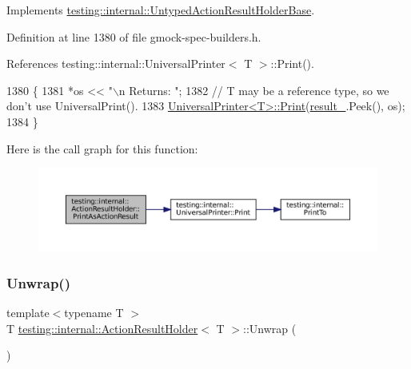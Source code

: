 Implements \hyperlink{classtesting_1_1internal_1_1UntypedActionResultHolderBase_a4b4a558fcb1d3b02c0fec34f186d3b90}{testing\+::internal\+::\+Untyped\+Action\+Result\+Holder\+Base}.



Definition at line 1380 of file gmock-\/spec-\/builders.\+h.



References testing\+::internal\+::\+Universal\+Printer$<$ T $>$\+::\+Print().


\begin{DoxyCode}
1380                                                          \{
1381     *os << \textcolor{stringliteral}{"\(\backslash\)n          Returns: "};
1382     \textcolor{comment}{// T may be a reference type, so we don't use UniversalPrint().}
1383     \hyperlink{classtesting_1_1internal_1_1UniversalPrinter_aecec021e1abbaa260b701e24e3fe33eb}{UniversalPrinter<T>::Print}(\hyperlink{classtesting_1_1internal_1_1ActionResultHolder_a76fc150d4247a041353cdd859976198b}{result\_}.Peek(), os);
1384   \}
\end{DoxyCode}
Here is the call graph for this function\+:
\nopagebreak
\begin{figure}[H]
\begin{center}
\leavevmode
\includegraphics[width=350pt]{classtesting_1_1internal_1_1ActionResultHolder_a06d1fb40fc863328dbcc102bc46dece4_cgraph}
\end{center}
\end{figure}
\mbox{\label{classtesting_1_1internal_1_1ActionResultHolder_a057df6cceeeab9ea06e679bcf6b78960}} 
\subsubsection{\texorpdfstring{Unwrap()}{Unwrap()}}
{\footnotesize\ttfamily template$<$typename T $>$ \\
T \hyperlink{classtesting_1_1internal_1_1ActionResultHolder}{testing\+::internal\+::\+Action\+Result\+Holder}$<$ T $>$\+::Unwrap (\begin{DoxyParamCaption}{ }\end{DoxyParamCaption})\hspace{0.3cm}{\ttfamily [inline]}}



